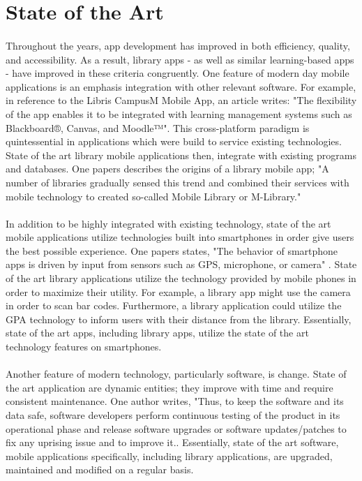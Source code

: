 \begin{itemize}
    \end{itemize}
    
    
\section{State of the Art}
    \paragraph{}
    Throughout the years, app development has improved in both efficiency, quality, and accessibility. As a result, library apps - as well as similar learning-based apps - have improved in these criteria congruently. One feature of modern day mobile applications is an emphasis integration with other relevant software. For example, in reference to the Libris CampusM Mobile App, an article writes: "The flexibility of the app enables it to be integrated with learning management systems such as Blackboard®, Canvas, and Moodle™"\cite{campusM}. This cross-platform paradigm is quintessential in applications which were build to service existing technologies. State of the art library mobile applications then, integrate with existing programs and databases. One papers describes the origins of a library mobile app; "A number of libraries gradually sensed this trend and combined their services with mobile technology to created so-called Mobile Library or M-Library." \cite{design_and_impl}
    \paragraph{}
    In addition to be highly integrated with existing technology, state of the art mobile applications utilize technologies built into smartphones in order give users the best possible experience. One papers states, "The behavior of smartphone apps is driven by input from sensors such as GPS, microphone, or camera"  \cite{}. State of the art library applications utilize the technology provided by mobile phones in order to maximize their utility. For example, a library app might use the camera in order to scan bar codes. Furthermore, a library application could utilize the GPA technology to inform users with their distance from the library. Essentially, state of the art apps, including library apps, utilize the state of the art technology features on smartphones.
    \paragraph{}
    Another feature of modern technology, particularly software, is change. State of the art application are dynamic entities; they improve with time and require consistent maintenance. One author writes, "Thus, to keep the software and its data safe, software developers perform continuous testing of the product in its operational phase and release software upgrades or software updates/patches to fix any uprising issue and to improve it.\cite{Reliability_modeling}.  Essentially, state of the art software, mobile applications specifically, including library applications, are upgraded, maintained and modified on a regular basis.
